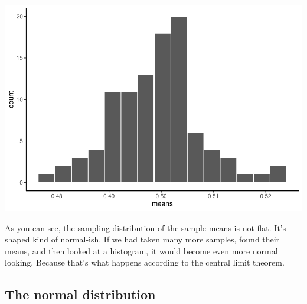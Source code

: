 \documentclass[]{book}
\newenvironment{Shaded}{\begin{snugshade}}{\end{snugshade}}
\newcommand{\KeywordTok}[1]{\textcolor[rgb]{0.13,0.29,0.53}{\textbf{#1}}}
\newcommand{\DataTypeTok}[1]{\textcolor[rgb]{0.13,0.29,0.53}{#1}}
\newcommand{\DecValTok}[1]{\textcolor[rgb]{0.00,0.00,0.81}{#1}}
\newcommand{\StringTok}[1]{\textcolor[rgb]{0.31,0.60,0.02}{#1}}
\newcommand{\CommentTok}[1]{\textcolor[rgb]{0.56,0.35,0.01}{\textit{#1}}}
\newcommand{\OperatorTok}[1]{\textcolor[rgb]{0.81,0.36,0.00}{\textbf{#1}}}
\newcommand{\NormalTok}[1]{#1}
\begin{document}
\begin{Shaded}
\end{Shaded}

\includegraphics{Statistics_Lab_files/figure-latex/unnamed-chunk-123-1.pdf}

As you can see, the sampling distribution of the sample means is not
flat. It's shaped kind of normal-ish. If we had taken many more samples,
found their means, and then looked at a histogram, it would become even
more normal looking. Because that's what happens according to the
central limit theorem.

\subsection{The normal distribution}\label{the-normal-distribution}
\end{document}
